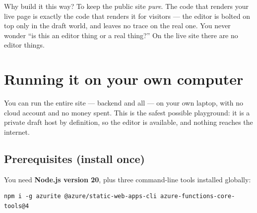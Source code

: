 \documentclass[11pt]{article}
\begin{document}
\begin{center}
\end{center}

Why build it this way? To keep the public site \emph{pure}. The code that renders
your live page is exactly the code that renders it for visitors --- the editor is
bolted on top only in the draft world, and leaves no trace on the real one. You never
wonder ``is this an editor thing or a real thing?'' On the live site there are no
editor things.

\section{Running it on your own computer}

You can run the entire site --- backend and all --- on your own laptop, with no cloud
account and no money spent. This is the safest possible playground: it is a private
draft host by definition, so the editor is available, and nothing reaches the
internet.

\subsection{Prerequisites (install once)}

You need \textbf{Node.js version 20}, plus three command-line tools installed
globally:

\begin{lstlisting}
npm i -g azurite @azure/static-web-apps-cli azure-functions-core-tools@4
\end{lstlisting}
\end{document}

